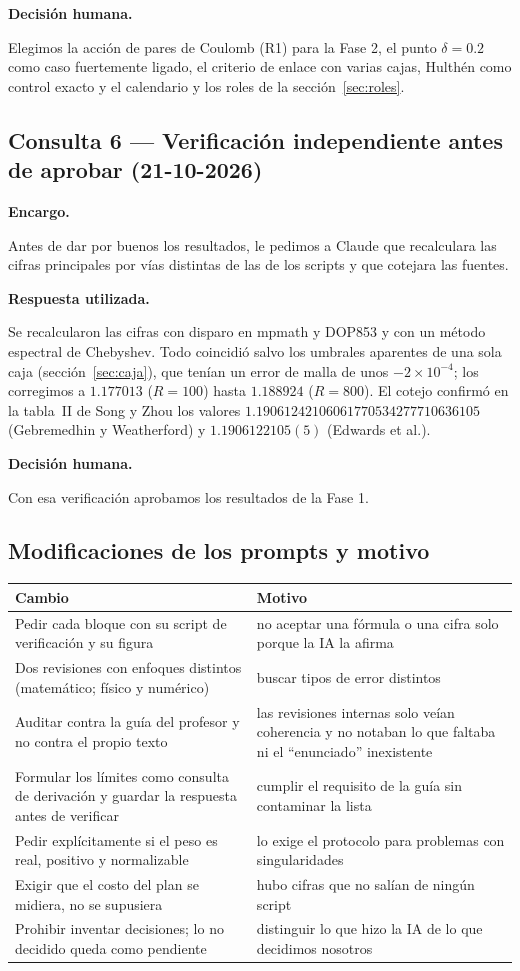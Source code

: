 \documentclass[11pt]{article}
\newcommand{\campo}[1]{\par\smallskip\textbf{#1}\par}
\begin{document}
\campo{Decisión humana.} Elegimos la acción de pares de Coulomb (R1) para la Fase 2, el punto $\delta=0.2$ como caso fuertemente ligado, el criterio de enlace con varias cajas, Hulthén como control exacto y el calendario y los roles de la sección~\ref{sec:roles}.

\subsection*{Consulta 6 --- Verificación independiente antes de aprobar (21-10-2026)}

\campo{Encargo.} Antes de dar por buenos los resultados, le pedimos a Claude que recalculara las cifras principales por vías distintas de las de los scripts y que cotejara las fuentes.

\campo{Respuesta utilizada.} Se recalcularon las cifras con disparo en mpmath y DOP853 y con un método espectral de Chebyshev. Todo coincidió salvo los umbrales aparentes de una sola caja (sección~\ref{sec:caja}), que tenían un error de malla de unos $-2\times10^{-4}$; los corregimos a $1.177013$ ($R=100$) hasta $1.188924$ ($R=800$). El cotejo confirmó en la tabla~II de Song y Zhou los valores $1.19061242106061770534277710636105$ (Gebremedhin y Weatherford) y $1.1906122105(5)$ (Edwards et al.).

\campo{Decisión humana.} Con esa verificación aprobamos los resultados de la Fase 1.

\subsection{Modificaciones de los prompts y motivo}

\begin{table}[H]
\centering
\small
\begin{tabular}{@{}L{7cm}L{7cm}@{}}
\toprule
\textbf{Cambio} & \textbf{Motivo}\\
\midrule
Pedir cada bloque con su script de verificación y su figura & no aceptar una fórmula o una cifra solo porque la IA la afirma\\
Dos revisiones con enfoques distintos (matemático; físico y numérico) & buscar tipos de error distintos\\
Auditar contra la guía del profesor y no contra el propio texto & las revisiones internas solo veían coherencia y no notaban lo que faltaba ni el ``enunciado'' inexistente\\
Formular los límites como consulta de derivación y guardar la respuesta antes de verificar & cumplir el requisito de la guía sin contaminar la lista\\
Pedir explícitamente si el peso es real, positivo y normalizable & lo exige el protocolo para problemas con singularidades\\
Exigir que el costo del plan se midiera, no se supusiera & hubo cifras que no salían de ningún script\\
Prohibir inventar decisiones; lo no decidido queda como pendiente & distinguir lo que hizo la IA de lo que decidimos nosotros\\
\bottomrule
\end{tabular}
\end{table}
\end{document}

